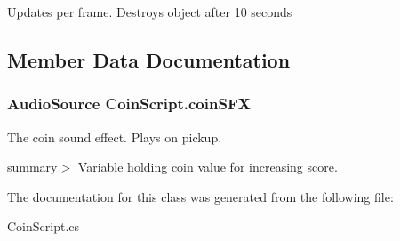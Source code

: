 Updates per frame. Destroys object after 10 seconds 



\subsection{Member Data Documentation}
\hypertarget{classCoinScript_aacded91c375e9ac952edf1a1091ed3a1}{
\subsubsection[{coin\-S\-F\-X}]{\setlength{\rightskip}{0pt plus 5cm}Audio\-Source Coin\-Script.\-coin\-S\-F\-X}}\label{classCoinScript_aacded91c375e9ac952edf1a1091ed3a1}


The coin sound effect. Plays on pickup. 

summary$>$ Variable holding coin value for increasing score. 

The documentation for this class was generated from the following file\-:\begin{DoxyCompactItemize}
\item 
Coin\-Script.\-cs\end{DoxyCompactItemize}
